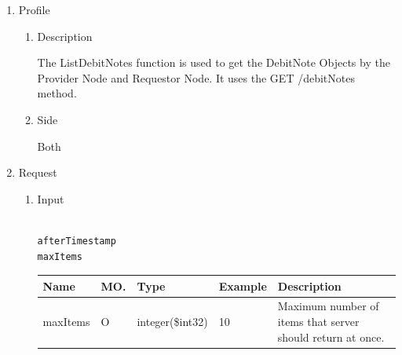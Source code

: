 \newpage



\begin{enumerate}

\item Profile

\begin{enumerate}

\item Description

The ListDebitNotes function is used to get the DebitNote Objects by the Provider Node and Requestor Node. 
It uses the GET /debitNotes method.
 
\item Side

Both

\end{enumerate}

\item Request

\begin{enumerate}

\item Input

\begin{tcolorbox}[boxrule=0pt, frame empty]
\begin{verbatim}

afterTimestamp
maxItems

\end{verbatim}
\end{tcolorbox}


\begin{table}[H]
\footnotesize

\begin{center}
\begin{tabular}{|p{3cm}|l|p{3cm}|p{3cm}|p{4cm}|} 
\hline
\rowcolor{lightgray}	Name	& MO.	& Type	& Example & 	Description \\
\hline

maxItems				& O	& 	integer(\$int32)	&	10							&	Maximum number of items that server should return at once. \\ 
\hline


\end{tabular}
\end{center}
\end{table}
\end{enumerate}
\end{enumerate}
